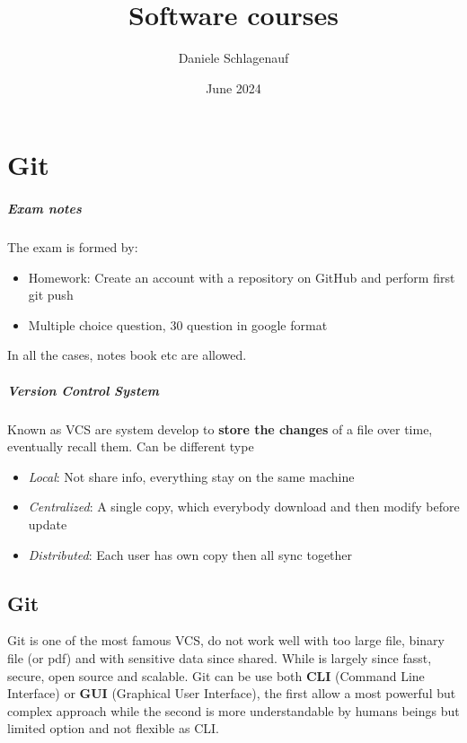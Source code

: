\documentclass{report}
\title{Software courses}
\author{Daniele Schlagenauf}
\date{June 2024}
\begin{document}
\maketitle

\chapter{Git}

\paragraph{Exam notes}
The exam is formed by:
\begin{itemize}
    \item Homework: Create an account with a repository on GitHub and perform first git push
    \item Multiple choice question, 30 question in google format  
\end{itemize}
In all the cases, notes book etc are allowed.

\paragraph{Version Control System}
Known as VCS are system develop to \textbf{store the changes} of a file over time, eventually recall them. Can be different type
\begin{itemize}
    \item \textit{Local}: Not share info, everything stay on the same machine 
    \item \textit{Centralized}:  A single copy, which everybody download and then modify before 
    update
    \item \textit{Distributed}: Each user has own copy then all sync together 
\end{itemize}

\section{Git}
Git is one of the most famous VCS, do not work well with too large file, binary file (or pdf) and with sensitive data since shared. While is largely since fasst, secure, open source and scalable.
\vspace{2mm}
Git can be use both \textbf{CLI} (Command Line Interface) or \textbf{GUI} (Graphical User Interface), the first allow a most powerful but complex approach while the second is more understandable by humans beings but limited option and not flexible as CLI.
\end{document}
